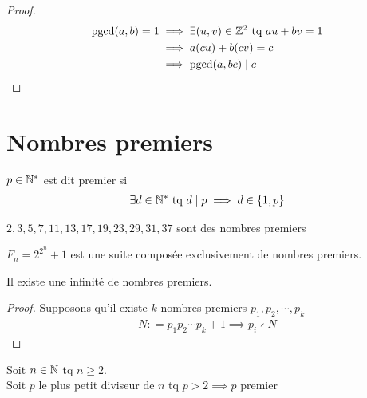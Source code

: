 \begin{proof}
\begin{align*}
\mathrm{pgcd}(a, b) = 1 &\implies \exists (u, v) \in \mathbb{Z}^2 \text{ tq } au + bv = 1 \\
&\implies a(cu) + b(cv) = c \\
&\implies \mathrm{pgcd}(a,bc) \mid c
\end{align*} 
\end{proof}

\section{Nombres premiers}
\begin{graybox}
\begin{definition}
$p \in \mathbb{N}^*$ est dit premier si 
\begin{align*}
\exists d \in \mathbb{N}^* \text{ tq } d \mid p \implies d \in \left\{ 1, p \right\}
\end{align*}
\end{definition}
\end{graybox}

\begin{exemple}
$2, 3, 5, 7, 11, 13, 17, 19, 23, 29, 31, 37$ sont des nombres premiers
\end{exemple}

\begin{remarque}
$F_n = 2^{2^n} + 1$ est une suite composée exclusivement de nombres premiers.
\end{remarque}

\begin{graybox}
\begin{theoreme}
	Il existe une infinité de nombres premiers.
\end{theoreme}
\end{graybox}

\begin{proof}
Supposons qu'il existe $k$ nombres premiers $p_1, p_2, \cdots, p_k$ 
\begin{align*}
N \colon = p_1 p_2 \cdots p_k + 1 \implies p_i \nmid N
\end{align*}
\end{proof}

\begin{graybox}
\begin{lemme}
Soit $n \in \mathbb{N}$ tq $n \geq 2$. \\ 
Soit $p$ le plus petit diviseur de $n$ tq $p > 2 \implies p$ premier  
\end{lemme}
\end{graybox}

